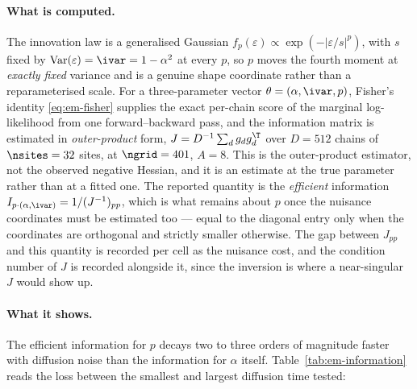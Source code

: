 \paragraph{What is computed.} The innovation law is a generalised Gaussian
$f_p(\varepsilon) \propto \exp(-|\varepsilon/s|^{p})$, with $s$ fixed by
$\operatorname{Var}(\varepsilon) = \ivar = 1-\alpha^2$ at every $p$, so
$p$ moves the fourth moment at \emph{exactly fixed} variance and is a
genuine shape coordinate rather than a reparameterised scale. For a
three-parameter vector $\theta = (\alpha, \ivar, p)$, Fisher's identity
\eqref{eq:em-fisher} supplies the exact per-chain score of the marginal
log-likelihood from one forward--backward pass, and the information matrix
is estimated in \emph{outer-product} form, $J = D^{-1}\sum_d g_d g_d^\T$
over $D=512$ chains of $\nsites=32$ sites, at $\ngrid=401$, $A=8$. This is the
outer-product estimator, not the observed negative Hessian, and it is an
estimate at the true parameter rather than at a fitted one. The reported
quantity is the \emph{efficient} information
$I_{p\cdot(\alpha,\ivar)} = 1/(J^{-1})_{pp}$, which is what remains
about $p$ once the nuisance coordinates must be estimated too --- equal
to the diagonal entry only when the coordinates are orthogonal and strictly
smaller otherwise. The gap between $J_{pp}$ and this quantity is
recorded per cell as the nuisance cost, and the condition number of $J$ is
recorded alongside it, since the inversion is where a near-singular $J$
would show up.

\paragraph{What it shows.} The efficient information for $p$ decays two
to three orders of magnitude faster with diffusion noise than the
information for $\alpha$ itself. Table~\ref{tab:em-information} reads the loss
between the smallest and largest diffusion time tested:

